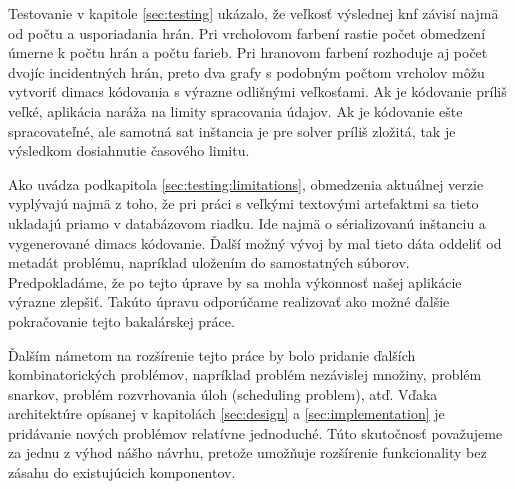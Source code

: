 Testovanie v kapitole \ref{sec:testing} ukázalo, že veľkosť výslednej \acrshort{knf} závisí najmä od počtu a usporiadania hrán. Pri vrcholovom farbení rastie počet obmedzení úmerne k počtu hrán a počtu farieb. Pri hranovom farbení rozhoduje aj počet dvojíc incidentných hrán, preto dva grafy s podobným počtom vrcholov môžu vytvoriť \acrshort{dimacs} kódovania s výrazne odlišnými veľkosťami. Ak je kódovanie príliš veľké, aplikácia naráža na limity spracovania údajov. Ak je kódovanie ešte spracovateľné, ale samotná \acrshort{sat} inštancia je pre solver príliš zložitá, tak je výsledkom dosiahnutie časového limitu.

Ako uvádza podkapitola \ref{sec:testing:limitations}, obmedzenia aktuálnej verzie vyplývajú najmä z toho, že pri práci s veľkými textovými artefaktmi sa tieto ukladajú priamo v databázovom riadku. Ide najmä o sérializovanú inštanciu a vygenerované \acrshort{dimacs} kódovanie. Ďalší možný vývoj by mal tieto dáta oddeliť od metadát problému, napríklad uložením do samostatných súborov. Predpokladáme, že po tejto úprave by sa mohla výkonnosť našej aplikácie výrazne zlepšiť. Takúto úpravu odporúčame realizovať ako možné ďalšie pokračovanie tejto bakalárskej práce.

Ďalším námetom na rozšírenie tejto práce by bolo pridanie ďalších kombinatorických problémov, napríklad problém nezávislej množiny, problém snarkov, problém rozvrhovania úloh (scheduling problem), atď. Vďaka architektúre opísanej v kapitolách \ref{sec:design} a \ref{sec:implementation} je pridávanie nových problémov relatívne jednoduché. Túto skutočnosť považujeme za jednu z výhod nášho návrhu, pretože umožňuje rozšírenie funkcionality bez zásahu do existujúcich komponentov.
